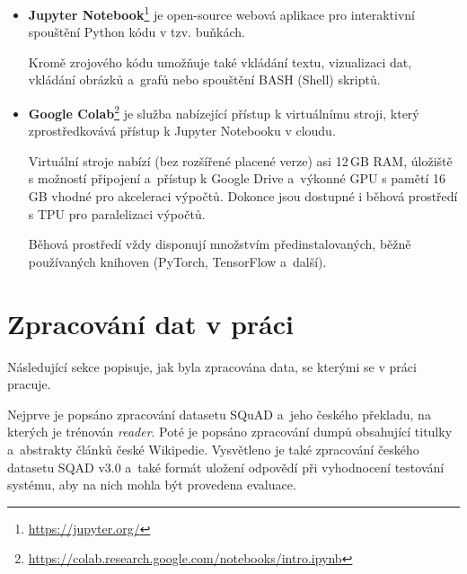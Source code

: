 \begin{itemize}
    \item \textbf{Jupyter Notebook}\footnote{\url{https://jupyter.org/}} 
    je open-source webová aplikace pro interaktivní spouštění Python kódu v tzv. buňkách.\par
    Kromě zrojového kódu umožňuje také vkládání textu, vizualizaci dat, vkládání obrázků a~grafů nebo spouštění BASH (Shell) skriptů.
    
    \item \textbf{Google Colab}\footnote{\url{https://colab.research.google.com/notebooks/intro.ipynb}}
    je služba nabízející přístup k virtuálnímu stroji, který zprostředkovává přístup k Jupyter Notebooku v cloudu.\par 
    Virtuální stroje nabízí (bez rozšířené placené verze) asi 12\,GB RAM, úložiště s možností připojení a~přístup k Google Drive a~výkonné GPU s pamětí 16\,GB vhodné pro akceleraci výpočtů. Dokonce jsou dostupné i běhová prostředí s TPU pro paralelizaci výpočtů.\par
    Běhová prostředí vždy disponují množstvím předinstalovaných, běžně používaných knihoven (PyTorch, TensorFlow a~další).
    
\end{itemize}

\section{Zpracování dat v práci}
\label{data_processing}
Následující sekce popisuje, jak byla zpracována data, se kterými se v práci pracuje. \par
\noindent Nejprve je popsáno zpracování datasetu SQuAD a~jeho českého překladu, na kterých je trénován \emph{reader}. Poté je popsáno zpracování dumpů obsahující titulky a~abstrakty článků české Wikipedie. Vysvětleno je také zpracování českého datasetu SQAD v3.0 a~také formát uložení odpovědí při vyhodnocení testování systému, aby na nich mohla být provedena evaluace. 

